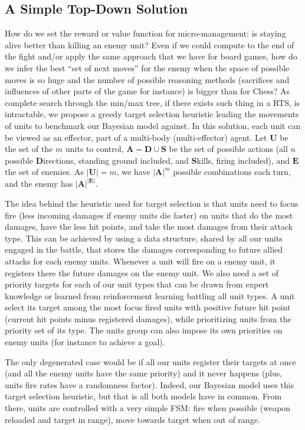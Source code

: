 \citep{SYNNAEVE:Micro}


\subsection{A Simple Top-Down Solution}
How do we set the reward or value function for micro-management: is staying alive better than killing an enemy unit? Even if we could compute to the end of the fight and/or apply the same approach that we have for board games, how do we infer the best ``set of next moves'' for the enemy when the space of possible moves is so huge and the number of possible reasoning methods (sacrifices and influences of other parts of the game for instance) is bigger than for Chess? As complete search through the min/max tree, if there exists such thing in a RTS, is intractable, we propose a greedy target selection heuristic leading the movements of units to benchmark our Bayesian model against. In this solution, each unit can be viewed as an effector, part of a multi-body (multi-effector) agent. 
Let $\mathbf{U}$ be the set of the $m$ units to control, $\mathbf{A} = \mathbf{D} \cup \mathbf{S}$ be the set of possible actions (all $n$ possible $\mathbf{D}$irections, standing ground included, and $\mathbf{S}$kills, firing included), and $\mathbf{E}$ the set of enemies. As $|\mathbf{U}| = m$, we have $|\mathbf{A}|^{m}$ possible combinations each turn, and the enemy has $|\mathbf{A}|^{|\mathbf{E}|}$. 
    
The idea behind the heuristic used for target selection is that units need to focus fire (less incoming damages if enemy units die faster) on units that do the most damages, have the less hit points, and take the most damages from their attack type. This can be achieved by using a data structure, shared by all our units engaged in the battle, that stores the damages corresponding to future allied attacks for each enemy units. Whenever a unit will fire on a enemy unit, it registers there the future damages on the enemy unit. We also need a set of priority targets for each of our unit types that can be drawn from expert knowledge or learned from reinforcement learning battling all unit types. A unit select its target among the most focus fired units with positive future hit point (current hit points minus registered damages), while prioritizing units from the priority set of its type. The units group can also impose its own priorities on enemy units (for instance to achieve a goal).

The only degenerated case would be if all our units register their targets at once (and all the enemy units have the same priority) and it never happens (plus, units fire rates have a randomness factor). 
Indeed, our Bayesian model uses this target selection heuristic, but that is all both models have in common. From there, units are controlled with a very simple FSM: fire when possible (weapon reloaded and target in range), move towards target when out of range.

